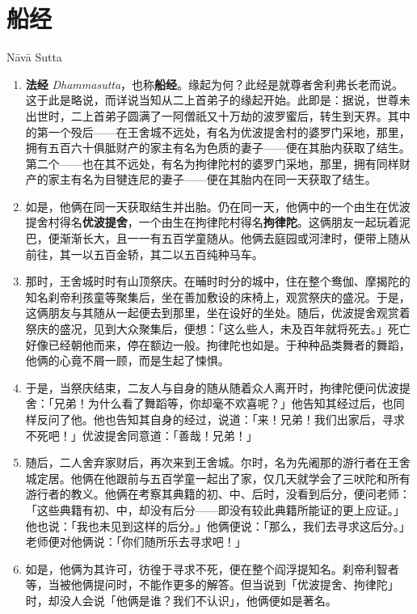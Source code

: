 \section{船经}

\begin{center}Nāvā Sutta\end{center}\vspace{1em}

\begin{enumerate}\item \textbf{法经} \textit{Dhammasutta}，也称\textbf{船经}。缘起为何？此经是就尊者舍利弗长老而说。这于此是略说，而详说当知从二上首弟子的缘起开始。此即是：据说，世尊未出世时，二上首弟子圆满了一阿僧祇又十万劫的波罗蜜后，转生到天界。其中的第一个殁后——在王舍城不远处，有名为优波提舍村的婆罗门采地，那里，拥有五百六十俱胝财产的家主有名为色质的妻子——便在其胎内获取了结生。第二个——也在其不远处，有名为拘律陀村的婆罗门采地，那里，拥有同样财产的家主有名为目犍连尼的妻子——便在其胎内在同一天获取了结生。
\item 如是，他俩在同一天获取结生并出胎。仍在同一天，他俩中的一个由生在优波提舍村得名\textbf{优波提舍}，一个由生在拘律陀村得名\textbf{拘律陀}。这俩朋友一起玩着泥巴，便渐渐长大，且一一有五百学童随从。他俩去庭园或河津时，便带上随从前往，其一以五百金轿，其二以五百纯种马车。
\item 那时，王舍城时时有山顶祭庆。在晡时时分的城中，住在整个鸯伽、摩揭陀的知名刹帝利孩童等聚集后，坐在善加敷设的床椅上，观赏祭庆的盛况。于是，这俩朋友与其随从一起便去到那里，坐在设好的坐处。随后，优波提舍观赏着祭庆的盛况，见到大众聚集后，便想：「这么些人，未及百年就将死去。」死亡好像已经朝他而来，停在额边一般。拘律陀也如是。于种种品类舞者的舞蹈，他俩的心竟不屑一顾，而是生起了悚惧。
\item 于是，当祭庆结束，二友人与自身的随从随着众人离开时，拘律陀便问优波提舍：「兄弟！为什么看了舞蹈等，你却毫不欢喜呢？」他告知其经过后，也同样反问了他。他也告知其自身的经过，说道：「来！兄弟！我们出家后，寻求不死吧！」优波提舍同意道：「善哉！兄弟！」
\item 随后，二人舍弃家财后，再次来到王舍城。尔时，名为先阇那的游行者在王舍城定居。他俩在他跟前与五百学童一起出了家，仅几天就学会了三吠陀和所有游行者的教义。他俩在考察其典籍的初、中、后时，没看到后分，便问老师：「这些典籍有初、中，却没有后分——即没有较此典籍所能证的更上应证。」他也说：「我也未见到这样的后分。」他俩便说：「那么，我们去寻求这后分。」老师便对他俩说：「你们随所乐去寻求吧！」
\item 如是，他俩为其许可，彷徨于寻求不死，便在整个阎浮提知名。刹帝利智者等，当被他俩提问时，不能作更多的解答。但当说到「优波提舍、拘律陀」时，却没人会说「他俩是谁？我们不认识」，他俩便如是著名。

\end{enumerate}

